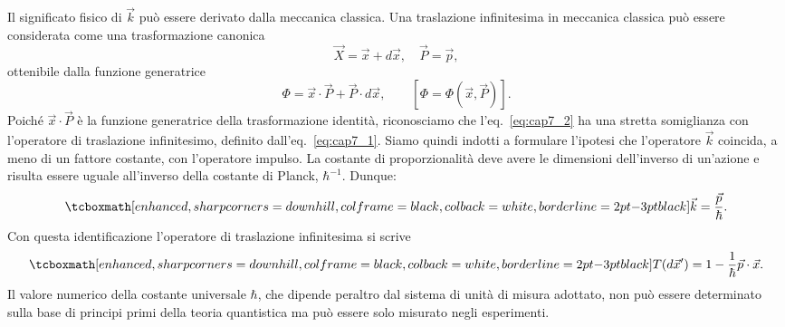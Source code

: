 Il significato fisico di $\vec{k}$ può essere derivato dalla meccanica classica. Una traslazione infinitesima in meccanica classica può essere considerata come una trasformazione canonica
	\begin{equation}
		\vec{X}= \vec{x}+ d\vec{x}, \quad \vec{P}= \vec{p} ,
	\end{equation}
ottenibile dalla funzione generatrice
	\begin{equation}
		\label{eq:cap7_2}
		\Phi = \vec{x}\cdot \vec{P}+\vec{P}\cdot d\vec{x} ,\qquad\left[\Phi=\Phi ( \vec{x}, \vec{P} ) \right].
	\end{equation}
Poiché $\vec{x} \cdot \vec{P}$ è la funzione generatrice della trasformazione identità, riconosciamo che l'eq.~\eqref{eq:cap7_2} ha una stretta somiglianza con l'operatore di traslazione infinitesimo, definito dall'eq.~\eqref{eq:cap7_1}. Siamo quindi indotti a  formulare l'ipotesi che l'operatore $\vec{k}$ coincida, a meno di un fattore costante, con l'operatore impulso. La costante di proporzionalità deve avere le dimensioni dell'inverso di un'azione e risulta essere uguale all'inverso della costante di Planck, $\hbar ^{-1}$. Dunque:
	\begin{equation}
		\tcboxmath[enhanced, sharp corners=downhill, colframe=black, colback=white, borderline={2pt}{-3pt}{black}]{	
			\vec{k}=\frac{\vec{p}}{\hbar}.
			}
	\end{equation}
Con questa identificazione l'operatore di traslazione infinitesima si scrive
	\begin{equation}
		\label{eq:cap7_3}
		\tcboxmath[enhanced, sharp corners=downhill, colframe=black, colback=white, borderline={2pt}{-3pt}{black}]{
			T(d\vec{x}') = 1-\frac{1}{\hbar}\vec{p}\cdot\vec{x}.
			}
	\end{equation}
Il valore numerico della costante universale $\hbar$, che dipende peraltro dal sistema di unità di misura adottato, non può essere determinato sulla base di principi primi della teoria quantistica ma può essere solo misurato negli esperimenti. \\

